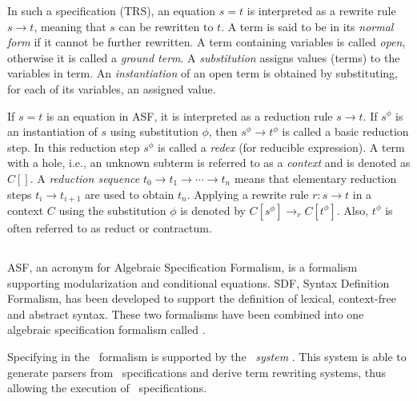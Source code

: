 
In such a specification (TRS), an equation $s = t$ is interpreted
as a rewrite rule $s\rightarrow t$, meaning that $s$
can be rewritten to $t$. A term is said to be in its {\em normal form}
if it cannot be further rewritten.
A term containing variables is called {\em open},
otherwise it is called a {\em ground term}. A {\em substitution}
assigns values (terms) to the variables in term. An {\em instantiation}
of an open term is obtained by substituting, for each of its variables,
an assigned value.

If $s = t$ is an equation in ASF, it is interpreted as a reduction
rule $s \rightarrow t$. If $s^\phi$ is an instantiation of $s$ using 
substitution $\phi$, then $s^\phi \rightarrow t^\phi$ is called a 
basic reduction step. In this reduction step $s^\phi$ is called a
{\em redex} (for reducible expression). A term with a hole, i.e.,
an unknown subterm is referred to as a {\em context} and is
denoted as $C[ ]$. A {\em reduction sequence} $t_0 \rightarrow
t_1 \rightarrow \cdots \rightarrow t_n$ means that elementary
reduction steps $t_i \rightarrow t_{i+1}$ are used to obtain $t_n$.
Applying a rewrite rule $r: s \rightarrow t$ in a context $C$
using the substitution $\phi$ is denoted by 
$C[s^\phi] \rightarrow_r C[t^\phi]$.  Also, $t^\phi$ is often
referred to as reduct or contractum.
 

\subsection{\label{ASDF}\asdf }

  ASF, an acronym for Algebraic Specification Formalism, \cite{BHK89}
  is a formalism supporting modularization and conditional equations.
  SDF, Syntax Definition Formalism, has been developed \cite{HHKR89} to
  support the definition of lexical, context-free and abstract syntax.
  These two formalisms have been combined into one algebraic specification
  formalism called \asdf.

  Specifying in the \asdf\ formalism is supported by the
  \asdf\ {\em system} \cite{Kli93}.
  This system is able to generate parsers from \asdf\ specifications
  and derive term rewriting systems, %
  thus allowing the execution of \asdf\ specifications.


